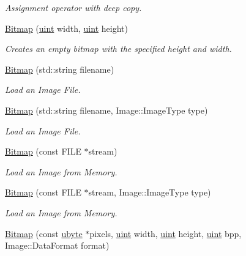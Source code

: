 \begin{DoxyCompactItemize}
\begin{DoxyCompactList}\small\item\em Assignment operator with deep copy. \item\end{DoxyCompactList}\item 
\hyperlink{class_f2_c_1_1_bitmap_a8e61f5101f6303564a679fd582051fe9}{Bitmap} (\hyperlink{namespace_f2_c_a58be2bac9eb3e3c99cb41b6008bf4fae}{uint} width, \hyperlink{namespace_f2_c_a58be2bac9eb3e3c99cb41b6008bf4fae}{uint} height)
\begin{DoxyCompactList}\small\item\em Creates an empty bitmap with the specified height and width. \item\end{DoxyCompactList}\item 
\hyperlink{class_f2_c_1_1_bitmap_a2fc3db9e8487a8826b5e2105963aad14}{Bitmap} (std::string filename)
\begin{DoxyCompactList}\small\item\em Load an Image File. \item\end{DoxyCompactList}\item 
\hyperlink{class_f2_c_1_1_bitmap_a89985844df7be6208ab82f479d7f0957}{Bitmap} (std::string filename, Image::ImageType type)
\begin{DoxyCompactList}\small\item\em Load an Image File. \item\end{DoxyCompactList}\item 
\hyperlink{class_f2_c_1_1_bitmap_ab70cd9b1ee024f477c4329a50aeb3d65}{Bitmap} (const FILE $\ast$stream)
\begin{DoxyCompactList}\small\item\em Load an Image from Memory. \item\end{DoxyCompactList}\item 
\hyperlink{class_f2_c_1_1_bitmap_a71aea59a7da710e1e8ff17270b25c0e4}{Bitmap} (const FILE $\ast$stream, Image::ImageType type)
\begin{DoxyCompactList}\small\item\em Load an Image from Memory. \item\end{DoxyCompactList}\item 
\hyperlink{class_f2_c_1_1_bitmap_a073dc6afa7a1f97907f60359210b1d6b}{Bitmap} (const \hyperlink{namespace_f2_c_a74fad364688add30796d711e5635ac77}{ubyte} $\ast$pixels, \hyperlink{namespace_f2_c_a58be2bac9eb3e3c99cb41b6008bf4fae}{uint} width, \hyperlink{namespace_f2_c_a58be2bac9eb3e3c99cb41b6008bf4fae}{uint} height, \hyperlink{namespace_f2_c_a58be2bac9eb3e3c99cb41b6008bf4fae}{uint} bpp, Image::DataFormat format)

\end{DoxyCompactItemize}
